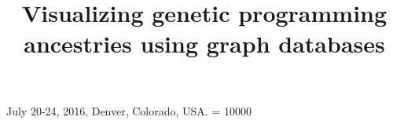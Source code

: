 \documentclass{sig-alternate}
\begin{document}
 {July 20-24, 2016, Denver, Colorado, USA.}
\widowpenalty = 10000
    
\title{Visualizing genetic programming ancestries using graph databases}


\maketitle
\end{document}

